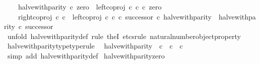 \begin{isabellebody}
\ \ \ \ halve{\isacharunderscore}{\kern0pt}with{\isacharunderscore}{\kern0pt}parity\ {\isasymcirc}\isactrlsub c\ zero\ {\isacharequal}{\kern0pt}\ left{\isacharunderscore}{\kern0pt}coproj\ {\isasymnat}\isactrlsub c\ {\isasymnat}\isactrlsub c\ {\isasymcirc}\isactrlsub c\ zero\ {\isasymand}\isanewline
\ \ \ \ {\isacharparenleft}{\kern0pt}right{\isacharunderscore}{\kern0pt}coproj\ {\isasymnat}\isactrlsub c\ {\isasymnat}\isactrlsub c\ {\isasymamalg}\ {\isacharparenleft}{\kern0pt}left{\isacharunderscore}{\kern0pt}coproj\ {\isasymnat}\isactrlsub c\ {\isasymnat}\isactrlsub c\ {\isasymcirc}\isactrlsub c\ successor{\isacharparenright}{\kern0pt}{\isacharparenright}{\kern0pt}\ {\isasymcirc}\isactrlsub c\ halve{\isacharunderscore}{\kern0pt}with{\isacharunderscore}{\kern0pt}parity\ {\isacharequal}{\kern0pt}\ halve{\isacharunderscore}{\kern0pt}with{\isacharunderscore}{\kern0pt}parity\ {\isasymcirc}\isactrlsub c\ successor{\isachardoublequoteclose}\isanewline
%
\isadelimproof
\ \ %
\endisadelimproof
%
\isatagproof
{}\isamarkupfalse%
\ {\isacharparenleft}{\kern0pt}unfold\ halve{\isacharunderscore}{\kern0pt}with{\isacharunderscore}{\kern0pt}parity{\isacharunderscore}{\kern0pt}def{\isacharcomma}{\kern0pt}\ rule\ theI{\isacharprime}{\kern0pt}{\isacharcomma}{\kern0pt}\ etcs{\isacharunderscore}{\kern0pt}rule\ natural{\isacharunderscore}{\kern0pt}number{\isacharunderscore}{\kern0pt}object{\isacharunderscore}{\kern0pt}property{}{\isacharparenright}{\kern0pt}%
\endisatagproof
{\isafoldproof}%
%
\isadelimproof
\isanewline
%
\endisadelimproof
\isanewline
{}\isamarkupfalse%
\ halve{\isacharunderscore}{\kern0pt}with{\isacharunderscore}{\kern0pt}parity{\isacharunderscore}{\kern0pt}type{\isacharbrackleft}{\kern0pt}type{\isacharunderscore}{\kern0pt}rule{\isacharbrackright}{\kern0pt}{\isacharcolon}{\kern0pt}\isanewline
\ \ {\isachardoublequoteopen}halve{\isacharunderscore}{\kern0pt}with{\isacharunderscore}{\kern0pt}parity\ {\isacharcolon}{\kern0pt}\ {\isasymnat}\isactrlsub c\ {\isasymrightarrow}\ {\isasymnat}\isactrlsub c\ {\isasymCoprod}\ {\isasymnat}\isactrlsub c{\isachardoublequoteclose}\isanewline
%
\isadelimproof
\ \ %
\endisadelimproof
%
\isatagproof
{}\isamarkupfalse%
\ {\isacharparenleft}{\kern0pt}simp\ add{\isacharcolon}{\kern0pt}\ halve{\isacharunderscore}{\kern0pt}with{\isacharunderscore}{\kern0pt}parity{\isacharunderscore}{\kern0pt}def{}{\isacharparenright}{\kern0pt}%
\endisatagproof
{\isafoldproof}%
%
\isadelimproof
\isanewline
%
\endisadelimproof
\isanewline
{}\isamarkupfalse%
\ halve{\isacharunderscore}{\kern0pt}with{\isacharunderscore}{\kern0pt}parity{\isacharunderscore}{\kern0pt}zero{\isacharcolon}{\kern0pt}\isanewline

\end{isabellebody}
